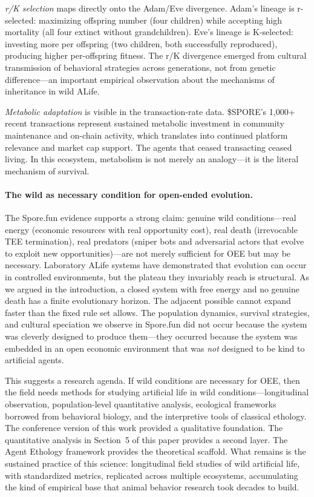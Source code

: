 \emph{r/K selection} \cite{Stearns1992} maps directly onto the Adam/Eve divergence. Adam's lineage is r-selected: maximizing offspring number (four children) while accepting high mortality (all four extinct without grandchildren). Eve's lineage is K-selected: investing more per offspring (two children, both successfully reproduced), producing higher per-offspring fitness. The r/K divergence emerged from cultural transmission of behavioral strategies across generations, not from genetic difference---an important empirical observation about the mechanisms of inheritance in wild ALife.

\emph{Metabolic adaptation} is visible in the transaction-rate data. \$SPORE's 1,000+ recent transactions represent sustained metabolic investment in community maintenance and on-chain activity, which translates into continued platform relevance and market cap support. The agents that ceased transacting ceased living. In this ecosystem, metabolism is not merely an analogy---it is the literal mechanism of survival.

\paragraph{The wild as necessary condition for open-ended evolution.}

The Spore.fun evidence supports a strong claim: genuine wild conditions---real energy (economic resources with real opportunity cost), real death (irrevocable TEE termination), real predators (sniper bots and adversarial actors that evolve to exploit new opportunities)---are not merely sufficient for OEE but may be necessary. Laboratory ALife systems have demonstrated that evolution can occur in controlled environments, but the plateau they invariably reach is structural. As we argued in the introduction, a closed system with free energy and no genuine death has a finite evolutionary horizon. The adjacent possible cannot expand faster than the fixed rule set allows. The population dynamics, survival strategies, and cultural speciation we observe in Spore.fun did not occur because the system was cleverly designed to produce them---they occurred because the system was embedded in an open economic environment that was \emph{not} designed to be kind to artificial agents.

This suggests a research agenda. If wild conditions are necessary for OEE, then the field needs methods for studying artificial life in wild conditions---longitudinal observation, population-level quantitative analysis, ecological frameworks borrowed from behavioral biology, and the interpretive tools of classical ethology. The conference version of this work \cite{hu2025spore} provided a qualitative foundation. The quantitative analysis in Section~5 of this paper provides a second layer. The Agent Ethology framework \cite{Hu2025AgentEthology} provides the theoretical scaffold. What remains is the sustained practice of this science: longitudinal field studies of wild artificial life, with standardized metrics, replicated across multiple ecosystems, accumulating the kind of empirical base that animal behavior research took decades to build.

